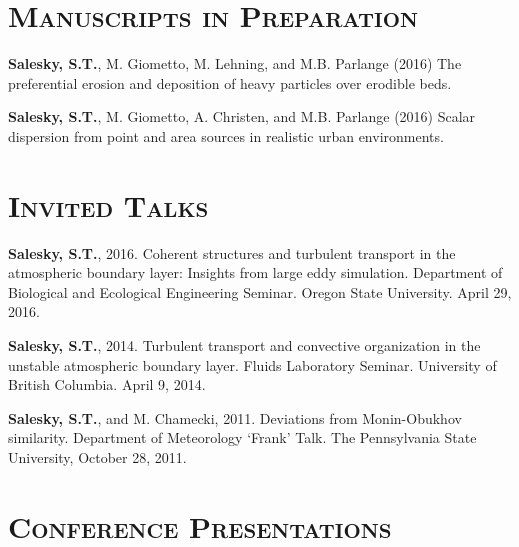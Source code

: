 \documentclass[11pt,letterpaper]{article}
\begin{document}
\section*{\textsc{Manuscripts in Preparation}} 

\textbf{Salesky, S.T.}, M. Giometto, M. Lehning, and M.B. Parlange (2016)
The preferential erosion and deposition of heavy particles over erodible beds.

\textbf{Salesky, S.T.}, M. Giometto, A. Christen, and M.B. Parlange (2016)
Scalar dispersion from point and area sources in realistic urban environments.


\section*{\textsc{Invited Talks}} 

\textbf{Salesky, S.T.}, 2016. Coherent structures and turbulent transport in the atmospheric boundary layer: Insights 
from large eddy simulation. Department of Biological and Ecological Engineering Seminar. Oregon State University. 
April 29, 2016.

\textbf{Salesky, S.T.}, 2014. Turbulent transport and convective organization in the unstable atmospheric boundary layer. Fluids Laboratory Seminar. University of British Columbia. April 9, 2014. 

\textbf{Salesky, S.T.}, and M. Chamecki, 2011. Deviations from Monin-Obukhov similarity. Department of Meteorology `Frank' Talk. The Pennsylvania State University, October 28, 2011. 

\section*{\textsc{Conference Presentations}} 

\end{document}
